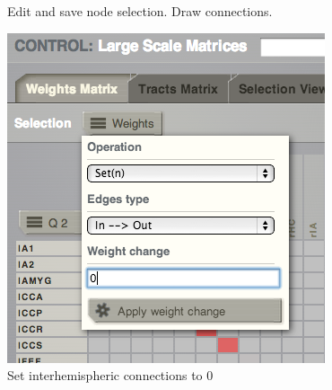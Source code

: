 \documentclass{tufte-handout}
\begin{document}
\begin{figure}
  \caption{Edit and save node selection. Draw connections.}
  \label{fig:steps_01_02_03_04}
\end{figure}


\begin{figure}[h]
  \includegraphics[width=\linewidth]{Handout_UI_ModellingStructuralLesions_EdgeOperations}%
  \caption{Set interhemispheric connections to 0}%
  \label{fig:steps_05_06}%
\end{figure}
\end{document}
